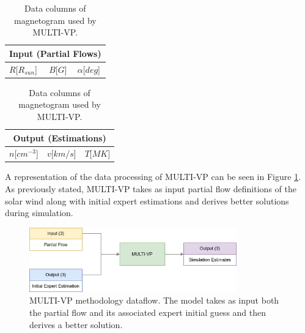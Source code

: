 \begin{table}[ht]
    \caption{Data columns of magnetogram used by MULTI-VP.}
    \label{tab:multivp_columns}
    \begin{subtable}[h]{0.32\textwidth}
        \centering
        \begin{tabular}{lcc}
        \hline
        \multicolumn{3}{c}{Input (Partial Flows)}                              \\ \hline
        $R${[}$R_{sun}${]} & $B${[}$G${]} & $\alpha${[}$deg${]} \\ \hline
        \end{tabular}
    \end{subtable}
    \begin{subtable}[h]{0.32\textwidth}
        \centering
        \begin{tabular}{ccc}
        \hline
        \multicolumn{3}{c}{Output (Estimations)}                           \\ \hline
        $n${[}$cm^{-3}${]} & $v${[}$km/s${]} & $T${[}$MK${]} \\ \hline
        \end{tabular}
    \end{subtable}
\end{table}

A representation of the data processing of MULTI-VP can be seen in Figure \ref{fig:multivp_method}. As previously stated, MULTI-VP takes as input partial flow definitions of the solar wind along with initial expert estimations and derives better solutions during simulation.

\vspace{0.5cm}
\begin{figure}[!h]
\centering
\includegraphics[width=0.8\textwidth]{figures/multivp_method.png}
\caption[MULTI-VP methodology dataflow]{MULTI-VP methodology dataflow. The model takes as input both the partial flow and its associated expert initial guess and then derives a better solution.\label{fig:multivp_method}}
\end{figure}


